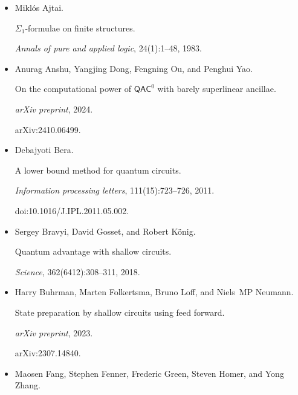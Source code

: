 \begin{itemize}


\item[] 
[1]

Miklós Ajtai.


$\Sigma_{1}$-formulae on finite structures.


\emph{Annals of pure and applied logic}, 24(1):1–48, 1983.





\item[] 
[2]

Anurag Anshu, Yangjing Dong, Fengning Ou, and Penghui Yao.


On the computational power of ${\mathsf{QAC}}^{0}$ with barely superlinear
ancillae.


\emph{arXiv preprint}, 2024.


arXiv:2410.06499.





\item[] 
[3]

Debajyoti Bera.


A lower bound method for quantum circuits.


\emph{Information processing letters}, 111(15):723–726, 2011.


doi:10.1016/J.IPL.2011.05.002.





\item[] 
[4]

Sergey Bravyi, David Gosset, and Robert König.


Quantum advantage with shallow circuits.


\emph{Science}, 362(6412):308–311, 2018.





\item[] 
[5]

Harry Buhrman, Marten Folkertsma, Bruno Loff, and Niels MP Neumann.


State preparation by shallow circuits using feed forward.


\emph{arXiv preprint}, 2023.


arXiv:2307.14840.





\item[] 
[6]

Maosen Fang, Stephen Fenner, Frederic Green, Steven Homer, and Yong Zhang.



\end{itemize}
